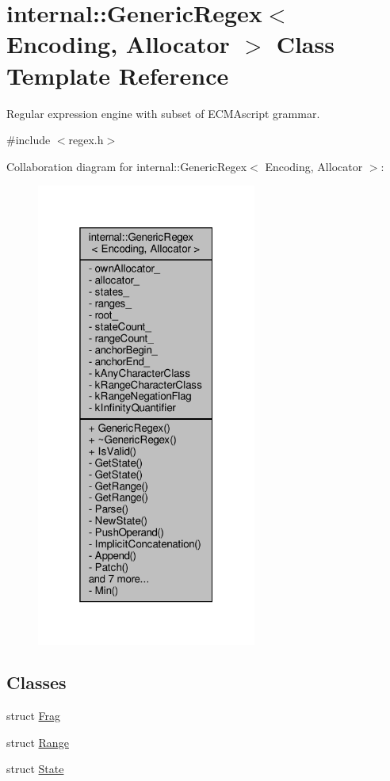 \hypertarget{classinternal_1_1GenericRegex}{}\section{internal\+:\+:Generic\+Regex$<$ Encoding, Allocator $>$ Class Template Reference}
\label{classinternal_1_1GenericRegex}


Regular expression engine with subset of E\+C\+M\+Ascript grammar.  




{\ttfamily \#include $<$regex.\+h$>$}



Collaboration diagram for internal\+:\+:Generic\+Regex$<$ Encoding, Allocator $>$\+:
\nopagebreak
\begin{figure}[H]
\begin{center}
\leavevmode
\includegraphics[width=205pt]{classinternal_1_1GenericRegex__coll__graph}
\end{center}
\end{figure}
\subsection*{Classes}
\begin{DoxyCompactItemize}
\item 
struct \hyperlink{structinternal_1_1GenericRegex_1_1Frag}{Frag}
\item 
struct \hyperlink{structinternal_1_1GenericRegex_1_1Range}{Range}
\item 
struct \hyperlink{structinternal_1_1GenericRegex_1_1State}{State}
\end{DoxyCompactItemize}

